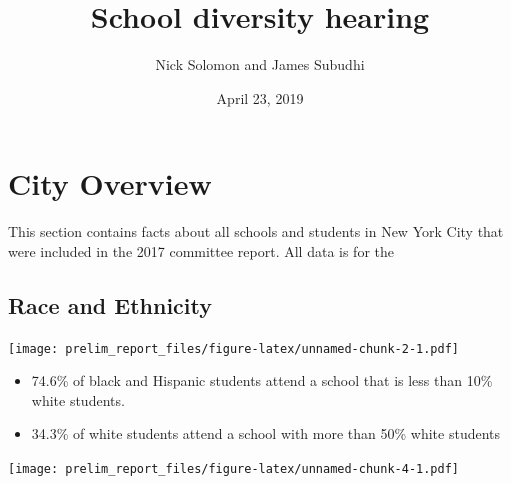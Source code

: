 \documentclass[11pt,]{article}
\title{School diversity hearing}
\author{Nick Solomon and James Subudhi}
\date{April 23, 2019}
\providecommand{\tightlist}{%
  \setlength{\itemsep}{0pt}\setlength{\parskip}{0pt}}
\begin{document}
\maketitle
\thispagestyle{fancy}

\hypertarget{city-overview}{%
\section{City Overview}\label{city-overview}}

This section contains facts about all schools and students in New York City that were included in the 2017 committee report. All data is for the

\hypertarget{race-and-ethnicity}{%
\subsection{Race and Ethnicity}\label{race-and-ethnicity}}

\texttt{[image: prelim\_report\_files/figure-latex/unnamed-chunk-2-1.pdf]}
\begin{itemize}
\tightlist
\item
  74.6\% of black and Hispanic students attend a school that is less than 10\% white students.
\item
  34.3\% of white students attend a school with more than 50\% white students
\end{itemize}
\texttt{[image: prelim\_report\_files/figure-latex/unnamed-chunk-4-1.pdf]}
\end{document}

